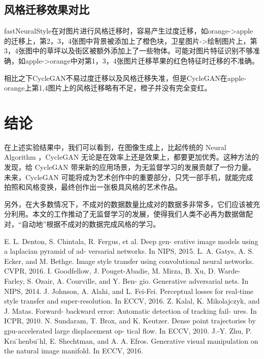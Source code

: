 \documentclass[conference]{IEEEtran}
\begin{document}
\subsection{风格迁移效果对比}

fastNeuralStyle在对图片进行风格迁移时，容易产生过度迁移，如orange->apple的迁移上，第2，3，4张图中背景被添加上了橙色块，卫星图片->绘制图片上，第3，4张图中的草坪以及街区被额外添加上了一些物体。可能对图片特征识别不够准确，如apple->orange中对第1，3，4张图片迁移苹果的红色特征时迁移的不准确。

相比之下CycleGAN不易过度迁移以及风格迁移失准，但是CycleGAN在apple-orange上第1,4图片上的风格迁移略有不足，橙子并没有完全变红。

\section{结论}

在上述实验结果中，我们可以看到，在图像生成上，比起传统的 Neural Algorithm ，CycleGAN 无论是在效率上还是效果上，都要更加优秀。这种方法的发现，给 CycleGAN 带来新的应用场景，为无监督学习的发展贡献了一份力量。未来，CycleGAN 可能将成为艺术创作中的重要部分，只凭一部手机，就能完成拍照和风格变换，最终创作出一张极具风格的艺术作品。

另外，在大多数情况下，不成对的数据数量比成对的数据多非常多，它们应该被充分利用。本文的工作推动了无监督学习的发展，使得我们人类不必再为数据做配对，“自动地”根据不成对的数据完成风格的学习。


\begin{thebibliography}{00}
 E. L. Denton, S. Chintala, R. Fergus, et al. Deep gen- erative image models using a laplacian pyramid of ad- versarial networks. In NIPS, 2015.
 L. A. Gatys, A. S. Ecker, and M. Bethge. Image style transfer using convolutional neural networks. CVPR, 2016.
 I. Goodfellow, J. Pouget-Abadie, M. Mirza, B. Xu, D. Warde-Farley, S. Ozair, A. Courville, and Y. Ben- gio. Generative adversarial nets. In NIPS, 2014.
 J. Johnson, A. Alahi, and L. Fei-Fei. Perceptual losses for real-time style transfer and super-resolution. In ECCV, 2016.
 Z. Kalal, K. Mikolajczyk, and J. Matas. Forward- backward error: Automatic detection of tracking fail- ures. In ICPR, 2010.
 N. Sundaram, T. Brox, and K. Keutzer. Dense point trajectories by gpu-accelerated large displacement op- tical flow. In ECCV, 2010.
 J.-Y. Zhu, P. Kra ̈henbu ̈hl, E. Shechtman, and A. A. Efros. Generative visual manipulation on the natural image manifold. In ECCV, 2016.
\end{thebibliography}
\end{document}

